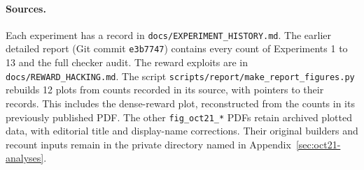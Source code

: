 \documentclass[11pt]{article}
\newcommand{\code}[1]{\texttt{#1}}
\newcommand{\pth}[1]{\nolinkurl{#1}}
\begin{document}
\paragraph{Sources.}
Each experiment has a record in \pth{docs/EXPERIMENT_HISTORY.md}.
The earlier detailed report (Git commit \code{e3b7747}) contains every count of Experiments 1 to 13 and the full checker audit.
The reward exploits are in \pth{docs/REWARD_HACKING.md}.
The script \pth{scripts/report/make_report_figures.py} rebuilds 12 plots from counts recorded in its source, with pointers to their records.
This includes the dense-reward plot, reconstructed from the counts in its previously published PDF.
The other \pth{fig_oct21_*} PDFs retain archived plotted data, with editorial title and display-name corrections.
Their original builders and recount inputs remain in the private directory named in Appendix~\ref{sec:oct21-analyses}.
\end{document}
